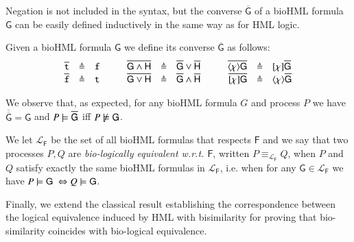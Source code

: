 Negation is not included in the syntax, but the converse $\overline{\mathsf{G}}$ of a bioHML formula $\mathsf{G}$ can be easily defined inductively in the same way as for HML logic.

\begin{definition}[Converse]
Given a bioHML formula $\mathsf{G}$ we define its converse $\overline{\mathsf{G}}$ as follows:
\[
\begin{array}{rcl@{\hspace{1cm}}rcl@{\hspace{1cm}}rcl}
\overline{\tt t} & \defeq & {\tt f} &
\overline{\mathsf{G} \wedge \mathsf{H}} & \defeq & \overline{\mathsf{G}} \vee \overline{\mathsf{H}} &
\overline{\langle \chi \rangle \mathsf{G}} & \defeq & [\chi]\overline{\mathsf{G}}
\\
\overline{\tt f} & \defeq & {\tt t} &
\overline{\mathsf{G} \vee \mathsf{H}} & \defeq & \overline{\mathsf{G}} \wedge \overline{\mathsf{H}} &
\overline{[\chi]\mathsf{G}} & \defeq & \langle \chi \rangle\overline{\mathsf{G}}
\end{array}
\]
\end{definition}

We observe that, as expected, for any bioHML formula $G$ and process $P$ we have $\overline{\overline{\mathsf{G}}} = \mathsf{G}$ and  $P \models \overline{\mathsf{G}}$ iff  $P\not\models \mathsf{G}$.

\begin{definition}
We let $\mathcal{L}_{\mathsf{F}}$ be the set of all bioHML formulas that respects $\mathsf{F}$ and 
we say that two processes $P,Q$ are \emph{bio-logically equivalent w.r.t. $\mathsf{F}$}, written $P \equiv_{\mathcal{L}_{\mathsf{F}}}Q$, when $P$ and $Q$ satisfy exactly the same bioHML formulas in $\mathcal{L}_{\mathsf{F}}$, i.e. when for any $\mathsf{G}\in \mathcal{L}_{\mathsf{F}}$ we have $P \entails \mathsf{G}\ \Leftrightarrow Q \entails \mathsf{G}$.
\end{definition}

Finally, we extend the classical result establishing the correspondence between the logical equivalence induced by HML with bisimilarity for proving that bio-similarity coincides with bio-logical equivalence.




